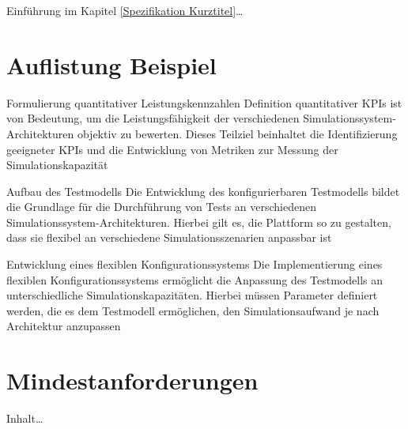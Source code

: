 
Einführung im Kapitel \ref{Spezifikation Kurztitel}\ldots

\section{Auflistung Beispiel}

\begin{Itemize}
  \item Formulierung quantitativer Leistungskennzahlen
  \newline
  Definition quantitativer KPIs ist von Bedeutung, um die Leistungsfähigkeit der
  verschiedenen Simulationssystem-Architekturen objektiv zu bewerten. Dieses Teilziel
  beinhaltet die Identifizierung geeigneter KPIs und die Entwicklung von Metriken zur Messung
  der Simulationskapazität
  \item Aufbau des Testmodells
  \newline
  Die Entwicklung des konfigurierbaren Testmodells bildet die Grundlage für die Durchführung von
  Tests an verschiedenen Simulationssystem-Architekturen. Hierbei gilt es, die Plattform so zu gestalten,
  dass sie flexibel an verschiedene Simulationsszenarien anpassbar ist
  \item Entwicklung eines flexiblen Konfigurationssystems
  \newline
  Die Implementierung eines flexiblen Konfigurationssystems ermöglicht die Anpassung des Testmodells an
  unterschiedliche Simulationskapazitäten. Hierbei müssen Parameter definiert werden, die es dem Testmodell
  ermöglichen, den Simulationsaufwand je nach Architektur anzupassen
\end{Itemize}

\section{Mindestanforderungen}

Inhalt\ldots

